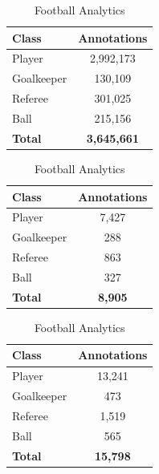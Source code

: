 \begin{table}[H]
\centering
\small
\caption{Commonly Used Datasets in Literature}
\label{tab:bbox_comparison}

\begin{minipage}[t]{0.31\textwidth}
\centering
\caption*{SoccerNet Dataset \cite{tracking}}
\begin{tabular}{lc}
\toprule
\textbf{Class} & \textbf{Annotations} \\
\midrule
Player       & 2,992,173 \\
Goalkeeper   & 130,109 \\
Referee      & 301,025 \\
Ball         & 215,156 \\
\midrule
\textbf{Total} & \textbf{3,645,661} \\
\bottomrule
\end{tabular}
\end{minipage}
\hfill
\begin{minipage}[t]{0.31\textwidth}
\centering
\caption*{Roboflow Dataset \cite{roboflow}}
\begin{tabular}{lc}
\toprule
\textbf{Class} & \textbf{Annotations} \\
\midrule
Player       & 7,427 \\
Goalkeeper   & 288 \\
Referee      & 863 \\
Ball         & 327 \\
\midrule
\textbf{Total} & \textbf{8,905} \\
\bottomrule
\end{tabular}
\end{minipage}
\hfill
\begin{minipage}[t]{0.31\textwidth}
\centering
\caption*{Football Analytics \cite{mradovic38_football_analysis_repo}}
\begin{tabular}{lc}
\toprule
\textbf{Class} & \textbf{Annotations} \\
\midrule
Player       & 13,241 \\
Goalkeeper   & 473 \\
Referee      & 1,519 \\
Ball         & 565 \\
\midrule
\textbf{Total} & \textbf{15,798} \\
\bottomrule
\end{tabular}
\end{minipage}

\end{table}

